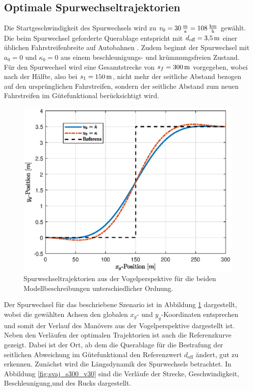 \subsection{Optimale Spurwechseltrajektorien}\label{subsec:Spurwechseltrajektorien}
Die Startgeschwindigkeit des Spurwechsels wird zu $v_0 = 30\,\mathrm{\frac{\mathrm{m}}{\mathrm{s}}} = 108\,\mathrm{\frac{\mathrm{km}}{\mathrm{h}}}$ gewählt. Die beim Spurwechsel geforderte Querablage entspricht mit $d_{\textrm{off}} = 3{,}5\,\mathrm{m}$ einer üblichen Fahrstreifenbreite auf Autobahnen \cite{ForschungsgesellschaftfurStraenundVerkehrswesen.2008}. Zudem beginnt der Spurwechsel mit $a_0 = 0$ und $\kappa_0 = 0$ aus einem beschleunigungs- und krümmungsfreien Zustand. Für den Spurwechsel wird eine Gesamtstrecke von $s_f = 300\,\mathrm{m}$ vorgegeben, wobei nach der Hälfte, also bei $s_1 = 150\,\mathrm{m}$, nicht mehr der seitliche Abstand bezogen auf den ursprünglichen Fahrstreifen, sondern der seitliche Abstand zum neuen Fahrstreifen im Gütefunktional berücksichtigt wird. 
\begin{figure}[h] 
	\centering
	\includegraphics[width=0.7\linewidth]{./Bilder/Ergebnisse/Geradeausfahrt/Spurwechsel/xy_pos_s300_v30.eps}
	\caption{Spurwechseltrajektorien aus der Vogelperspektive für die beiden Modellbeschreibungen unterschiedlicher Ordnung.}
	\label{fig:xy_pos_s300_v30}
\end{figure} 
Der Spurwechsel für das beschriebene Szenario ist in Abbildung \ref{fig:xy_pos_s300_v30} dargestellt, wobei die gewählten Achsen den globalen $x_g$- und $y_g$-Koordinaten entsprechen und somit der Verlauf des Manövers aus der Vogelperspektive dargestellt ist. Neben den Verläufen der optimalen Trajektorien ist auch die Referenzkurve gezeigt. Dabei ist der Ort, ab dem die Querablage für die Bestrafung der seitlichen Abweichung im Gütefunktional den Referenzwert $d_{\textrm{off}}$ ändert, gut zu erkennen. Zunächst wird die Längsdynamik des Spurwechsels betrachtet. In Abbildung \ref{fig:svaj_s300_v30} sind die Verläufe der Strecke, Geschwindigkeit, Beschleunigung,und des Rucks dargestellt. 
